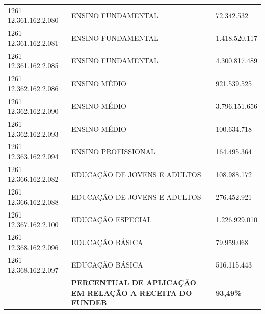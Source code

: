 \documentclass{article}
\begin{document}
\begin{longtable}[c]{m{3cm}|m{12cm}|m{3cm}}
\multicolumn{1}{L{3cm}|}{1261 12.361.162.2.080} & \multicolumn{1}{L{12cm}|}{ENSINO FUNDAMENTAL} & \multicolumn{1}{R{3cm}}{72.342.532} \\
\multicolumn{1}{L{3cm}|}{1261 12.361.162.2.081} & \multicolumn{1}{L{12cm}|}{ENSINO FUNDAMENTAL} & \multicolumn{1}{R{3cm}}{1.418.520.117} \\
\multicolumn{1}{L{3cm}|}{1261 12.361.162.2.085} & \multicolumn{1}{L{12cm}|}{ENSINO FUNDAMENTAL} & \multicolumn{1}{R{3cm}}{4.300.817.489} \\
\multicolumn{1}{L{3cm}|}{1261 12.362.162.2.086} & \multicolumn{1}{L{12cm}|}{ENSINO MÉDIO} & \multicolumn{1}{R{3cm}}{921.539.525} \\
\multicolumn{1}{L{3cm}|}{1261 12.362.162.2.090} & \multicolumn{1}{L{12cm}|}{ENSINO MÉDIO} & \multicolumn{1}{R{3cm}}{3.796.151.656} \\
\multicolumn{1}{L{3cm}|}{1261 12.362.162.2.093} & \multicolumn{1}{L{12cm}|}{ENSINO MÉDIO} & \multicolumn{1}{R{3cm}}{100.634.718} \\
\multicolumn{1}{L{3cm}|}{1261 12.363.162.2.094} & \multicolumn{1}{L{12cm}|}{ENSINO PROFISSIONAL} & \multicolumn{1}{R{3cm}}{164.495.364} \\
\multicolumn{1}{L{3cm}|}{1261 12.366.162.2.082} & \multicolumn{1}{L{12cm}|}{EDUCAÇÃO DE JOVENS E ADULTOS} & \multicolumn{1}{R{3cm}}{108.988.172} \\
\multicolumn{1}{L{3cm}|}{1261 12.366.162.2.088} & \multicolumn{1}{L{12cm}|}{EDUCAÇÃO DE JOVENS E ADULTOS} & \multicolumn{1}{R{3cm}}{276.452.921} \\
\multicolumn{1}{L{3cm}|}{1261 12.367.162.2.100} & \multicolumn{1}{L{12cm}|}{EDUCAÇÃO ESPECIAL} & \multicolumn{1}{R{3cm}}{1.226.929.010} \\
\multicolumn{1}{L{3cm}|}{1261 12.368.162.2.096} & \multicolumn{1}{L{12cm}|}{EDUCAÇÃO BÁSICA} & \multicolumn{1}{R{3cm}}{79.959.068} \\
\multicolumn{1}{L{3cm}|}{1261 12.368.162.2.097} & \multicolumn{1}{L{12cm}|}{EDUCAÇÃO BÁSICA} & \multicolumn{1}{R{3cm}}{516.115.443} \\
\hline\hline
\multicolumn{1}{L{3cm}|}{ \textbf{}} & \multicolumn{1}{L{12cm}|}{ \textbf{PERCENTUAL DE APLICAÇÃO EM RELAÇÃO A RECEITA DO FUNDEB}} & \multicolumn{1}{R{3cm}}{ \textbf{93,49\%}} \\\hline\hline\hline\end{longtable}\vspace{-0.4cm} \raggedright\fontsize{7pt}{10pt}\selectfont {FONTE: Armazém Sisor.} \\\fontsize{7pt}{10pt}\selectfont {ELABORAÇÃO: DCAF/SCPPO/SEPLAG}\\
\end{document}
